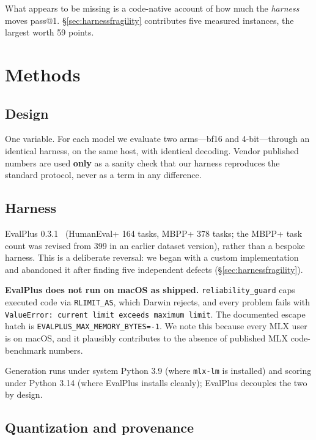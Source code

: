 \documentclass[11pt]{article}
\begin{document}
What appears to be missing is a code-native account of how much the \emph{harness} moves
pass@1. \S\ref{sec:harnessfragility} contributes five measured instances, the largest
worth 59 points.

\section{Methods}
\label{sec:methods}

\subsection{Design}

One variable. For each model we evaluate two arms---bf16 and 4-bit---through an
identical harness, on the same host, with identical decoding. Vendor published numbers
are used \textbf{only} as a sanity check that our harness reproduces the standard
protocol, never as a term in any difference.

\subsection{Harness}
\label{sec:harness}

EvalPlus 0.3.1~\citep{evalplusrepo} (HumanEval+ 164 tasks, MBPP+ 378 tasks; the MBPP+
task count was revised from 399 in an earlier dataset version), rather than a bespoke
harness.
This is a deliberate reversal: we began with a custom implementation and abandoned it
after finding five independent defects (\S\ref{sec:harnessfragility}).

\textbf{EvalPlus does not run on macOS as shipped.} \texttt{reliability\_guard} caps
executed code via \texttt{RLIMIT\_AS}, which Darwin rejects, and every problem fails with
\texttt{ValueError: current limit exceeds maximum limit}. The documented escape hatch is
\texttt{EVALPLUS\_MAX\_MEMORY\_BYTES=-1}. We note this because every MLX user is on
macOS, and it plausibly contributes to the absence of published MLX code-benchmark
numbers.

Generation runs under system Python 3.9 (where \texttt{mlx-lm} is installed) and scoring
under Python 3.14 (where EvalPlus installs cleanly); EvalPlus decouples the two by
design.

\subsection{Quantization and provenance}
\label{sec:quantprovenance}
\end{document}
